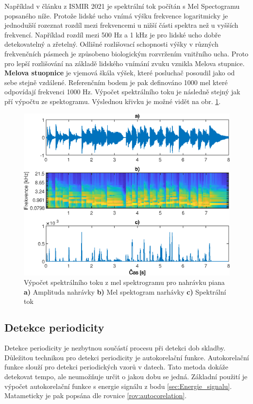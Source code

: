   Například v článku z \acs{ISMIR} 2021 \cite{tempobeatdownbeat:book} je spektrální tok počítán s Mel Spectogramu popsaného níže.
  Protože lidské ucho vnímá výšku frekvence logaritmicky je jednodužší rozeznat rozdíl mezi frekvencemi u nižší části spektra než u vyšších frekvencí.
  Například rozdíl mezi 500 Hz a 1 kHz je pro lidské ucho dobře detekovatelný a zřetelný.
  Odlišné rozlišovací schopnosti výšky v různých frekvenčních pásmech je způsobeno biologickým rozvržením vnitřního ucha. Proto pro lepší rozlišování na základě lidského vnímání zvuku vznikla Melova stupnice.
  \textbf{Melova stuopnice} je vjemová škála výšek, které posluchač posoudil jako od sebe stejně vzdálené. Referenčním bodem je pak definováno 1000 mel které odpovídají frekvenci 1000 Hz\cite{StevensS.S1937ASft}.
  Výpočet spektrálního toku je následně stejný jak pří výpočtu ze spektogramu. Výslednou křivku je možné vidět na obr. \ref{fig:Mel_spectralni_tok}.

  \begin{figure}[H]
    \centering
    \includegraphics[width = 0.8\linewidth]{obrazky/Mel_spektralni_tok.eps}
    \caption{Výpočet spektrálního toku z mel spektrogramu pro nahrávku piana \textbf{a)} Amplituda nahrávky \textbf{b)} Mel spektogram narhávky \textbf{c)} Spektrální tok}
    \label{fig:Mel_spectralni_tok}
  \end{figure}


  \subsection{Detekce periodicity}
    Detekce periodicity je nezbytnou součástí procesu při detekci dob skladby.
    Důležitou technikou pro detekci periodicity je autokorelační funkce.
    Autokorelační funkce slouží pro detekci periodických vzorů v datech.
    Tato metoda dokáže detekovat tempo, ale neumožňuje určit o jakou dobu se jedná.
    Základní použití je výpočet autokorelační funkce s energie signálu z bodu \ref{sec:Energie_signalu}. Matameticky je pak popsána dle rovnice \ref{rov:autocorelation}. \cite{Signal_processing_methods_for_music_transcription}

